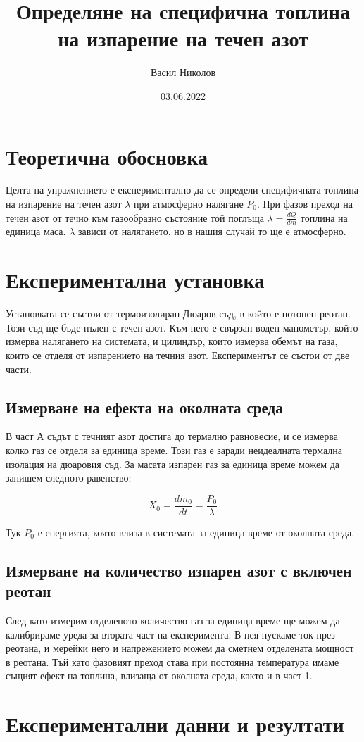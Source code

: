 \documentclass[%
 reprint,
 amsmath,amssymb,
 aps,
]{revtex4-2}
\begin{document}
\setlength{\abovedisplayskip}{3pt}
\setlength{\belowdisplayskip}{3pt}    

\title{Определяне на специфична топлина на изпарение на течен азот}
\author{Васил Николов}
\date{03.06.2022}
\maketitle

\section{Теоретична обосновка}

Целта на упражнението е експериментално да се определи специфичната топлина на изпарение на течен азот $\lambda$ при атмосферно налягане $P_0$.
При фазов преход на течен азот от течно към газообразно състояние той поглъща $\lambda = \frac{dQ}{dm}$ топлина на единица маса. $\lambda$ зависи от налягането, но в нашия случай то ще е атмосферно. 

\section{Експериментална установка}

Установката се състои от термоизолиран Дюаров съд, в който е потопен реотан. Този съд ще бъде пълен с течен азот. Към него е свързан воден манометър, който измерва налягането на системата, и цилиндър, които измерва обемът на газа, които се отделя от изпарението на течния азот. Експериментът се състои от две части. 

\subsection{Измерване на ефекта на околната среда}

В част А съдът с течният азот достига до термално равновесие, и се измерва колко газ се отделя за единица време. Този газ е заради неидеалната термална изолация на дюаровия съд. За масата изпарен газ за единица време можем да запишем следното равенство:

\begin{equation*}
    X_0 = \frac{dm_0}{dt} = \frac{P_0}{\lambda}
\end{equation*}

Тук $P_0$ е енергията, която влиза в системата за единица време от околната среда.

\subsection{Измерване на количество изпарен азот с включен реотан}
След като измерим отделеното количество газ за единица време ще можем да калибрираме уреда за втората част на експеримента. В нея пускаме ток през реотана, и мерейки него и напрежението можем да сметнем отделената мощност в реотана. Тъй като фазовият преход става при постоянна температура имаме същият ефект на топлина, влизаща от околната среда, както и в част 1.  

\section{Експериментални данни и резултати}
\end{document}

